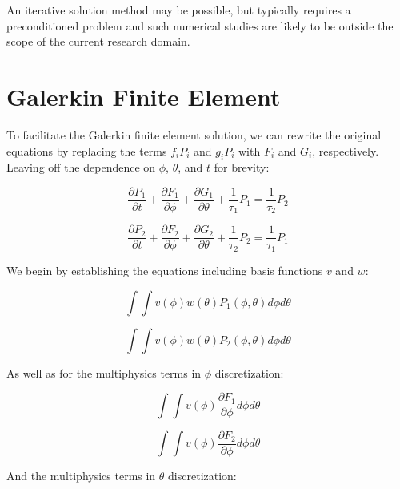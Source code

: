\documentclass[12pt,a4paper,pagesize=pdftex]{scrartcl}
\begin{document}
An iterative solution method may be possible, but typically requires a preconditioned problem and such numerical studies are likely to be outside the scope of the current research domain.

\newpage
\section*{Galerkin Finite Element}
To facilitate the Galerkin finite element solution, we can rewrite the original equations by replacing the terms \(f_i P_i\) and \(g_i P_i\) with \(F_i\) and \(G_i\), respectively. Leaving off the dependence on \(\phi\), \(\theta\), and \(t\) for brevity:

\begin{equation*}
    \frac{\partial P_1}{\partial t} + \frac{\partial F_1}{\partial \phi} + \frac{\partial G_1}{\partial \theta} + \frac{1}{\tau_1} P_1 = \frac{1}{\tau_2} P_2
\end{equation*}

\begin{equation*}
    \frac{\partial P_2}{\partial t} + \frac{\partial F_2}{\partial \phi} + \frac{\partial G_2}{\partial \theta} + \frac{1}{\tau_2} P_2 = \frac{1}{\tau_1} P_1
\end{equation*}

We begin by establishing the equations including basis functions \(v\) and \(w\):

\begin{equation*}
    \int \int v\left(\phi\right) w\left(\theta\right) P_1 \left(\phi, \theta\right) d\phi d\theta
\end{equation*}

\begin{equation*}
    \int \int v\left(\phi\right) w\left(\theta\right) P_2 \left(\phi, \theta\right) d\phi d\theta
\end{equation*}

As well as for the multiphysics terms in \(\phi\) discretization:

\begin{equation*}
    \int \int v\left(\phi\right) \frac{\partial F_1}{\partial \phi} d\phi d\theta
\end{equation*}

\begin{equation*}
    \int \int v\left(\phi\right) \frac{\partial F_2}{\partial \phi} d\phi d\theta
\end{equation*}

And the multiphysics terms in \(\theta\) discretization:
\end{document}
